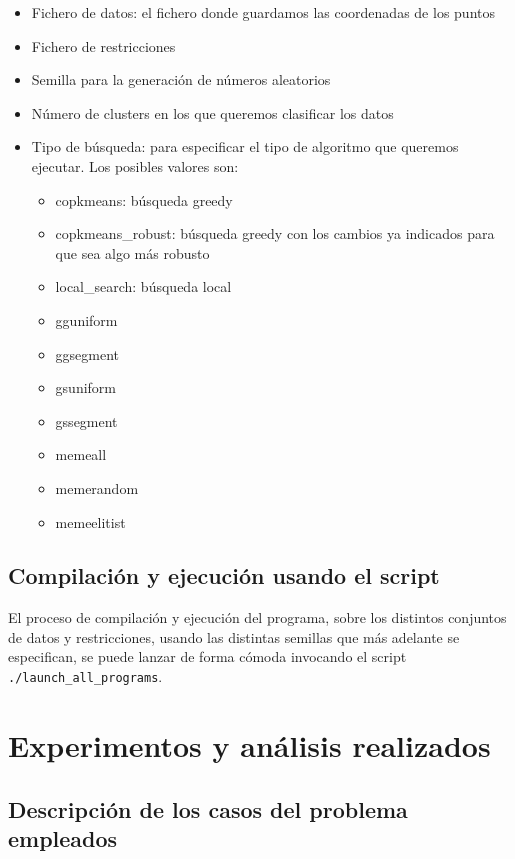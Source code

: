 \documentclass[11pt]{article}
\begin{document}
\begin{itemize}
    \item Fichero de datos: el fichero donde guardamos las coordenadas de los puntos
    \item Fichero de restricciones
    \item Semilla para la generación de números aleatorios
    \item Número de clusters en los que queremos clasificar los datos
    \item Tipo de búsqueda: para especificar el tipo de algoritmo que queremos ejecutar. Los posibles valores son:
    \begin{itemize}
        \item copkmeans: búsqueda greedy
        \item copkmeans\_robust: búsqueda greedy con los cambios ya indicados para que sea algo más robusto
        \item local\_search: búsqueda local
        \item gguniform
        \item ggsegment
        \item gsuniform
        \item gssegment
        \item memeall
        \item memerandom
        \item memeelitist
    \end{itemize}
\end{itemize}

\subsection{Compilación y ejecución usando el script}

El proceso de compilación y ejecución del programa, sobre los distintos conjuntos de datos y restricciones, usando las distintas semillas que más adelante se especifican, se puede lanzar de forma cómoda invocando el script \lstinline{./launch_all_programs}.

\pagebreak

\section{Experimentos y análisis realizados}

\subsection{Descripción de los casos del problema empleados}
\end{document}
